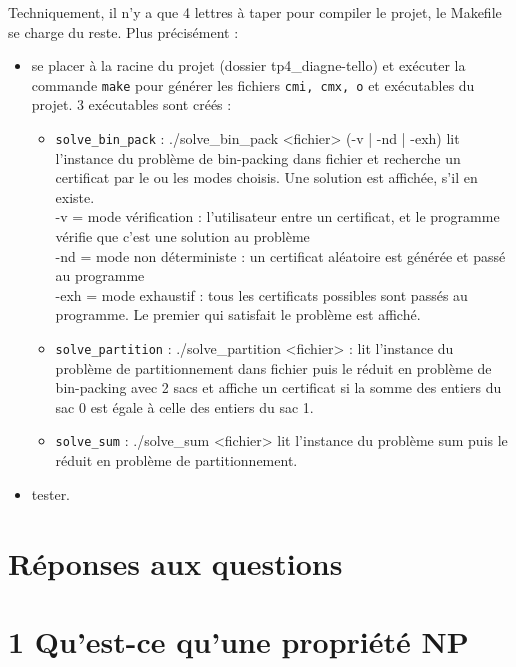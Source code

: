 Techniquement, il n'y a que 4 lettres à taper pour compiler le projet, le Makefile se charge du reste. Plus précisément :
\begin{itemize}[label=]
	\item se placer à la racine du projet (dossier tp4\_diagne-tello) et exécuter la commande \verb+make+ pour générer les fichiers \verb+cmi, cmx, o+ et exécutables du projet. 3 exécutables sont créés :
		\begin{itemize}[label=]
			\item \verb+solve_bin_pack+ : ./solve\_bin\_pack <fichier> (-v | -nd | -exh) lit l'instance du problème de bin-packing dans fichier et recherche un certificat par le ou les modes choisis. Une solution est affichée, s'il en existe.\\
-v = mode vérification : l'utilisateur entre un certificat, et le programme vérifie que c'est une solution au problème\\
-nd = mode non déterministe : un certificat aléatoire est générée et passé au programme\\
-exh = mode exhaustif : tous les certificats possibles sont passés au programme. Le premier qui satisfait le problème est affiché.
			\item \verb+solve_partition+ : ./solve\_partition <fichier> : lit l'instance du problème de partitionnement dans fichier puis le réduit en problème de bin-packing avec 2 sacs et affiche un certificat si la somme des entiers du sac 0 est égale à celle des entiers du sac 1.
			\item \verb+solve_sum+ : ./solve\_sum <fichier> lit l'instance du problème sum puis le réduit en problème de partitionnement.
		\end{itemize}
	\item tester.
\end{itemize}

\section*{Réponses aux questions}

\section*{1 Qu'est-ce qu'une propriété NP}

